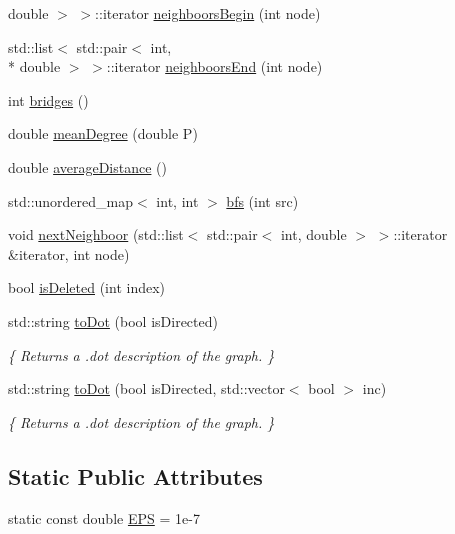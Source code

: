 \begin{DoxyCompactItemize}
double $>$ $>$\-::iterator \hyperlink{classamon_1_1_graph_a182d3611b27058fda589269589b62b41}{neighboors\-Begin} (int node)
\item 
std\-::list$<$ std\-::pair$<$ int, \\*
double $>$ $>$\-::iterator \hyperlink{classamon_1_1_graph_acaeb02df5f8d9bd71cf4aae11e89532f}{neighboors\-End} (int node)
\item 
int \hyperlink{classamon_1_1_graph_a0ea3919c713485cfc5b24fe3ef1aaf24}{bridges} ()
\item 
double \hyperlink{classamon_1_1_graph_a31712319c837723444fc5f83a272b41d}{mean\-Degree} (double P)
\item 
double \hyperlink{classamon_1_1_graph_ac0e052c99a3842aa205480156217c52b}{average\-Distance} ()
\item 
std\-::unordered\-\_\-map$<$ int, int $>$ \hyperlink{classamon_1_1_graph_a658ec90c39eb57958a286574cf463224}{bfs} (int src)
\item 
void \hyperlink{classamon_1_1_graph_a88ee59e7d320f210c4bb9eb1e4eff476}{next\-Neighboor} (std\-::list$<$ std\-::pair$<$ int, double $>$ $>$\-::iterator \&iterator, int node)
\item 
bool \hyperlink{classamon_1_1_graph_a17d2727539c869cb0a047d81b0236dad}{is\-Deleted} (int index)
\item 
std\-::string \hyperlink{classamon_1_1_graph_ad18818eecab5f005c6c3a12ca2461c52}{to\-Dot} (bool is\-Directed)
\begin{DoxyCompactList}\small\item\em \{ Returns a .dot description of the graph. \} \end{DoxyCompactList}\item 
std\-::string \hyperlink{classamon_1_1_graph_ad2c36a69520088dd76da23e13b372464}{to\-Dot} (bool is\-Directed, std\-::vector$<$ bool $>$ inc)
\begin{DoxyCompactList}\small\item\em \{ Returns a .dot description of the graph. \} \end{DoxyCompactList}\end{DoxyCompactItemize}
\subsection*{Static Public Attributes}
\begin{DoxyCompactItemize}
\item 
static const double \hyperlink{classamon_1_1_graph_a1bddebc6360d5154a86dbd75856b6a6c}{E\-P\-S} = 1e-\/7
\end{DoxyCompactItemize}


